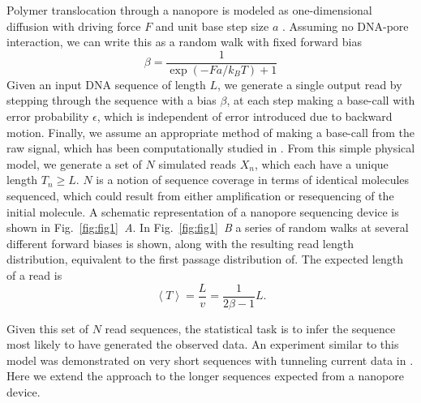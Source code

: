\documentclass{biophys_letter}
\newcommand{\bias}{\beta}
\newcommand{\err}{\epsilon}
\newcommand{\kje}[1]{\textcolor{BurntOrange}{#1}}
\begin{document}
\begin{multicols}{2}
\kje{Polymer translocation through a nanopore is modeled as one-dimensional diffusion with driving force $F$ and unit base step size $a$ \cite{Lubensky:1999}.}
Assuming no DNA-pore interaction, we can write this as a random walk with fixed forward bias \cite{Berg:1993}
\kje{\begin{equation}
  \bias = \frac{1}{\exp(-Fa/k_{B}T) + 1}
\end{equation}}
Given an input DNA sequence of length $L$, we generate a single output read by stepping through the sequence with a bias $\bias$, at each step making a base-call with error probability $\err$, which is independent of error introduced due to backward motion. 
Finally, we assume an appropriate method of making a base-call from the raw signal, which has been computationally studied in \cite{ODonnell:2013}.
From this simple physical model, we generate a set of $N$ simulated reads $X_n$, which each have a unique length $T_{n} \ge L$. 
$N$ is a notion of sequence coverage in terms of identical molecules sequenced, which could result from either amplification or resequencing of the initial molecule.
A schematic representation of a nanopore sequencing device is shown in Fig.~\ref{fig:fig1}\emph{~A}.
In Fig.~\ref{fig:fig1}\emph{~B} a series of random walks at several different forward biases is shown, along with the resulting read length distribution, equivalent to the first passage distribution of.
The expected length of a read is 
\begin{equation}
  \label{eq:expected-T}
  \left\langle T  \right\rangle = \frac{L}{v} = \frac{1}{2\bias-1} L.
\end{equation}

Given this set of $N$ read sequences, the statistical task is to infer the sequence most likely to have generated the observed data.
An experiment similar to this model was demonstrated on very short sequences with tunneling current data in \cite{Ohshiro:2012}.
Here we extend the approach to the longer sequences expected from a nanopore device.

\end{multicols}
\twocolumn
\end{document}
